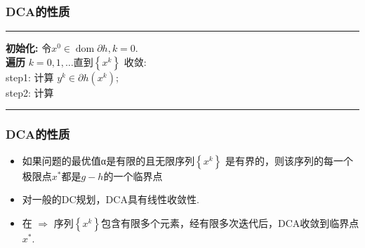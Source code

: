 \documentclass{beamer}
\begin{document}
\begin{frame}

\frametitle{DCA的性质}

\noindent
\rule{0.95\textwidth}{0.05em}

\textbf{初始化:} 令$x^{0} \in \operatorname{dom} \partial h, k=0 .$\\
\textbf{遍历} $k=0,1, \ldots$直到$\left\{x^{k}\right\}$ 收敛:\\ %
step1: 计算 $y^{k} \in \partial h\left(x^{k}\right)$;\\
step2: 计算 

\noindent
\rule[-1pt]{0.95\textwidth}{0.05em}


\end{frame}


\begin{frame}
\frametitle{DCA的性质}


\begin{itemize}[<+->]
	\item 如果问题的最优值α是有限的且无限序列$\left\{x^{k}\right\}$ 是有界的，则该序列的每一个极限点$x^{*}$都是$g-h$的一个临界点

	\item 对一般的DC规划，DCA具有线性收敛性.
	\item 在  $\Rightarrow$ 序列$\left\{x^{k}\right\}$包含有限多个元素，经有限多次迭代后，DCA收敛到临界点$x^{*}$.
\end{itemize}
\end{frame}
\end{document}
